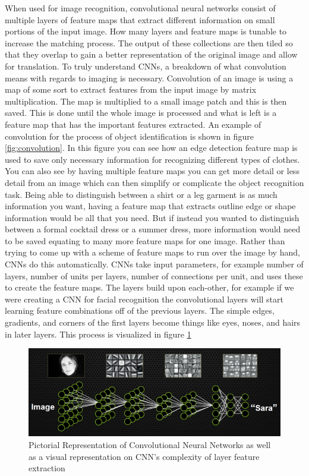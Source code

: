 When used for image recognition, convolutional neural networks consist of multiple layers of feature maps that extract different information on small portions of the input image. How many layers and feature maps is tunable to increase the matching process. The output of these collections are then tiled so that they overlap to gain a better representation of the original image and allow for translation. To truly understand CNNs, a breakdown of what convolution means with regards to imaging is necessary. Convolution of an image is using a map of some sort to extract features from the input image by matrix multiplication. The map is multiplied to a small image patch and this is then saved. This is done until the whole image is processed and what is left is a feature map that has the important features extracted. An example of convolution for the process of object identification is shown in figure \ref{fig:convolution}. In this figure you can see how an edge detection feature map is used to save only necessary information for recognizing different types of clothes. You can also see by having multiple feature maps you can get more detail or less detail from an image which can then simplify or complicate the object recognition task. Being able to distinguish between a shirt or a leg garment is as much information you want, having a feature map that extracts outline edge or shape information would be all that you need. But if instead you wanted to distinguish between a formal cocktail dress or a summer dress, more information would need to be saved equating to many more feature maps for one image. Rather than trying to come up with a scheme of feature maps to run over the image by hand, CNNs do this automatically. CNNs take input parameters, for example number of layers, number of units per layers, number of connections per unit, and uses these to create the feature maps. The layers build upon each-other, for example if we were creating a CNN for facial recognition the convolutional layers will start learning feature combinations off of the previous layers. The simple edges, gradients, and corners of the first layers become things like eyes, noses, and hairs in later layers. This process is visualized in figure \ref{fig:featuremaps} 

\begin{figure}[h!]
\centering
\includegraphics[width=.9\linewidth]{figs/facialDetection.png}
\caption{Pictorial Representation of Convolutional Neural Networks as well as a visual representation on CNN's complexity of layer feature extraction}
\label{fig:featuremaps}
\end{figure}
